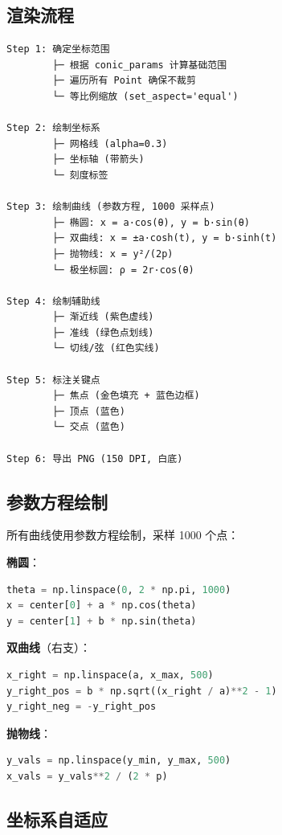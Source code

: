 \documentclass[11pt,a4paper]{article}
\begin{document}
\subsection{渲染流程}

\begin{verbatim}
Step 1: 确定坐标范围
        ├─ 根据 conic_params 计算基础范围
        ├─ 遍历所有 Point 确保不裁剪
        └─ 等比例缩放 (set_aspect='equal')

Step 2: 绘制坐标系
        ├─ 网格线 (alpha=0.3)
        ├─ 坐标轴 (带箭头)
        └─ 刻度标签

Step 3: 绘制曲线 (参数方程, 1000 采样点)
        ├─ 椭圆: x = a·cos(θ), y = b·sin(θ)
        ├─ 双曲线: x = ±a·cosh(t), y = b·sinh(t)
        ├─ 抛物线: x = y²/(2p)
        └─ 极坐标圆: ρ = 2r·cos(θ)

Step 4: 绘制辅助线
        ├─ 渐近线 (紫色虚线)
        ├─ 准线 (绿色点划线)
        └─ 切线/弦 (红色实线)

Step 5: 标注关键点
        ├─ 焦点 (金色填充 + 蓝色边框)
        ├─ 顶点 (蓝色)
        └─ 交点 (蓝色)

Step 6: 导出 PNG (150 DPI, 白底)
\end{verbatim}

\subsection{参数方程绘制}

所有曲线使用参数方程绘制，采样 1000 个点：

\textbf{椭圆}：

\begin{lstlisting}[language=Python]
theta = np.linspace(0, 2 * np.pi, 1000)
x = center[0] + a * np.cos(theta)
y = center[1] + b * np.sin(theta)
\end{lstlisting}

\textbf{双曲线}（右支）：

\begin{lstlisting}[language=Python]
x_right = np.linspace(a, x_max, 500)
y_right_pos = b * np.sqrt((x_right / a)**2 - 1)
y_right_neg = -y_right_pos
\end{lstlisting}

\textbf{抛物线}：

\begin{lstlisting}[language=Python]
y_vals = np.linspace(y_min, y_max, 500)
x_vals = y_vals**2 / (2 * p)
\end{lstlisting}

\subsection{坐标系自适应}
\end{document}
